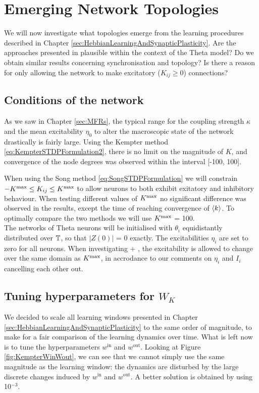 \newpage
\section{\mywork Emerging Network Topologies}

We will now investigate what topologies emerge from the learning procedures described in Chapter \ref{sec:HebbianLearningAndSynapticPlasticity}. Are the approaches presented in \cite{Kempter1999, Song2000, Song2017, ChrolCannon2012} plausible within the context of the Theta model? Do we obtain similar results concerning synchronisation and topology? Is there a reason for only allowing the network to make excitatory ($K_{ij} \geq 0$) connections? 

\subsection{Conditions of the network}
As we saw in Chapter \ref{sec:MFRs}, the typical range for the coupling strength $\kappa$ and the mean excitability $\eta_0$ to alter the macroscopic state of the network drastically is fairly large. Using the Kempter method \eqref{eq:KempterSTDPFormulation2}, there is no limit on the magnitude of $K$, and convergence of the node degrees was observed within the interval [-100, 100]. 

When using the Song method \eqref{eq:SongSTDPFormulation} we will constrain $-K^{\rm max} \leq K_{ij} \leq K^{\rm max}$ to allow neurons to both exhibit exitatory and inhibitory behaviour. When testing different values of $K^{\rm max}$ no significant difference was observed in the results, except the time of reaching convergence of ${\langle k\rangle}$. To optimally compare the two methods we will use $K^{\rm max}$ = 100. \\

The networks of Theta neurons will be initialised with $\theta_i$ equidistantly distributed over ${\mathbb{T}}$, so that $| Z(0) |$ = 0 exactly. The excitabilities $\eta_i$ are set to zero for all neurons. 
When investigating \STDP + \IP, the excitability is allowed to change over the same domain as $K^{\rm max}$, in accrodance to our comments on $\eta_i$ and $I_i$ cancelling each other out.

\subsection{Tuning hyperparameters for \texorpdfstring{$W_K$}{TEXT}}
We decided to scale all learning windows presented in Chapter \ref{sec:HebbianLearningAndSynapticPlasticity} to the same order of magnitude, to make for a fair comparison of the learning dynamics over time. What is left now is to tune the hyperparameters $w^{\mathrm{in}}$ and $w^{\mathrm{out}}$. Looking at Figure \ref{fig:KempterWinWout}, we can see that we cannot simply use the same magnitude as the learning window: the dynamics are disturbed by the large discrete changes induced by $w^{\mathrm{in}}$ and $w^{\mathrm{out}}$. A better solution is obtained by using 10$^{-3}$.

